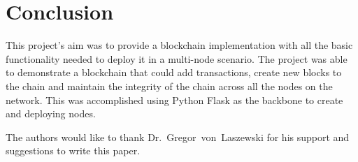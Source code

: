 \section{Conclusion}

This project's aim was to provide a blockchain implementation with all
the basic functionality needed to deploy it in a multi-node
scenario. The project was able to demonstrate a blockchain that could
add transactions, create new blocks to the chain and maintain the
integrity of the chain across all the nodes on the network. This was
accomplished using Python Flask as the backbone to create and
deploying nodes.

\begin{acks}

  The authors would like to thank Dr.~Gregor~von~Laszewski for his
  support and suggestions to write this paper.

\end{acks}


 

